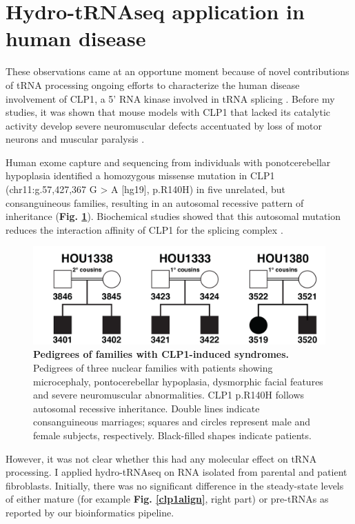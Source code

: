 \documentclass[12pt]{rockefeller}
\begin{document}
\section{Hydro-tRNAseq application in human disease}\label{clp1section}
These observations came at an opportune moment because of novel contributions of tRNA processing ongoing efforts to characterize the human disease involvement of \gls{CLP1}, a 5' RNA kinase involved in tRNA splicing \cite{Weitzer:2007hda}. Before my studies, it was shown that mouse models with CLP1 that lacked its catalytic activity develop severe neuromuscular defects accentuated by loss of motor neurons and muscular paralysis \cite{Hanada:2013bk}. 

Human exome capture and sequencing from individuals with ponotcerebellar hypoplasia identified a homozygous missense mutation in CLP1 (chr11:g.57,427,367 G > A [hg19], p.R140H) in five unrelated, but consanguineous families, resulting in an autosomal recessive pattern of inheritance (\textbf{Fig. \ref{pedigree}}). Biochemical studies showed that this autosomal mutation reduces the interaction affinity of CLP1 for the splicing complex \cite{Karaca:2014em}. 

\begin{figure}[!ht]%
\centering
\includegraphics[width=\textwidth]{pedigree1.png}%
\caption[Pedigrees of families with CLP1-induced syndromes.]
{\textbf{Pedigrees of families with CLP1-induced syndromes.}
Pedigrees of three nuclear families with patients showing microcephaly, pontocerebellar hypoplasia, dysmorphic facial features and severe neuromuscular abnormalities. CLP1 p.R140H follows autosomal recessive inheritance. Double lines indicate consanguineous marriages; squares and circles represent male and female subjects, respectively. Black-filled shapes indicate patients.}
\label{pedigree}
\end{figure}

However, it was not clear whether this had any molecular effect on tRNA processing. I applied hydro-tRNAseq on RNA isolated from parental and patient fibroblasts. Initially, there was no significant difference in the steady-state levels of either mature (for example \textbf{Fig. \ref{clp1align}}, right part) or pre-tRNAs as reported by our bioinformatics pipeline. 
\end{document}
